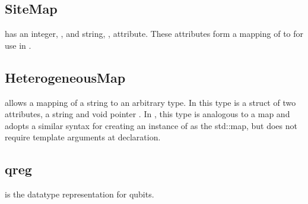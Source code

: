 

\subsection{\textbf{SiteMap}}\label{subsec:Sitemap}
 has an integer, , and string, , attribute. These attributes form a mapping of  to  for use in \Clang. \\

\subsection{\textbf{HeterogeneousMap}}\label{subsec:HeterogeneousMap}
 allows a mapping of a string to an arbitrary type. In \Clang this type is a struct of two attributes, a string  and void pointer . In \Cpp, this type is analogous to a map and adopts a similar syntax for creating an instance of  as the \Cpp std::map, but does not require template arguments at declaration. \\

\subsection{\textbf{qreg}}\label{subsec:qreg}
 is the datatype representation for qubits. \\
